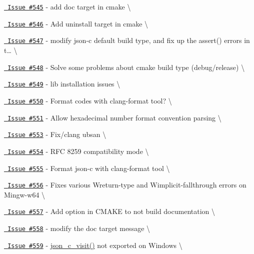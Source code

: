\begin{DoxyItemize}
\item \href{https://github.com/json-c/json-c/issues/545}{\texttt{ Issue \#545}} -\/ add doc target in cmake \textbackslash{}
\item \href{https://github.com/json-c/json-c/issues/546}{\texttt{ Issue \#546}} -\/ Add uninstall target in cmake \textbackslash{}
\item \href{https://github.com/json-c/json-c/issues/547}{\texttt{ Issue \#547}} -\/ modify json-\/c default build type, and fix up the assert() errors in t… \textbackslash{}
\item \href{https://github.com/json-c/json-c/issues/548}{\texttt{ Issue \#548}} -\/ Solve some problems about cmake build type (debug/release) \textbackslash{}
\item \href{https://github.com/json-c/json-c/issues/549}{\texttt{ Issue \#549}} -\/ lib installation issues \textbackslash{}
\item \href{https://github.com/json-c/json-c/issues/550}{\texttt{ Issue \#550}} -\/ Format codes with clang-\/format tool? \textbackslash{}
\item \href{https://github.com/json-c/json-c/issues/551}{\texttt{ Issue \#551}} -\/ Allow hexadecimal number format convention parsing \textbackslash{}
\item \href{https://github.com/json-c/json-c/issues/553}{\texttt{ Issue \#553}} -\/ Fix/clang ubsan \textbackslash{}
\item \href{https://github.com/json-c/json-c/issues/554}{\texttt{ Issue \#554}} -\/ RFC 8259 compatibility mode \textbackslash{}
\item \href{https://github.com/json-c/json-c/issues/555}{\texttt{ Issue \#555}} -\/ Format json-\/c with clang-\/format tool \textbackslash{}
\item \href{https://github.com/json-c/json-c/issues/556}{\texttt{ Issue \#556}} -\/ Fixes various Wreturn-\/type and Wimplicit-\/fallthrough errors on Mingw-\/w64 \textbackslash{}
\item \href{https://github.com/json-c/json-c/issues/557}{\texttt{ Issue \#557}} -\/ Add option in CMAKE to not build documentation \textbackslash{}
\item \href{https://github.com/json-c/json-c/issues/558}{\texttt{ Issue \#558}} -\/ modify the doc target message \textbackslash{}
\item \href{https://github.com/json-c/json-c/issues/559}{\texttt{ Issue \#559}} -\/ \mbox{\hyperlink{json__visit_8h_a0f585e56a5d417381cdf6c28538dbb20}{json\+\_\+c\+\_\+visit()}} not exported on Windows \textbackslash{}

\end{DoxyItemize}
